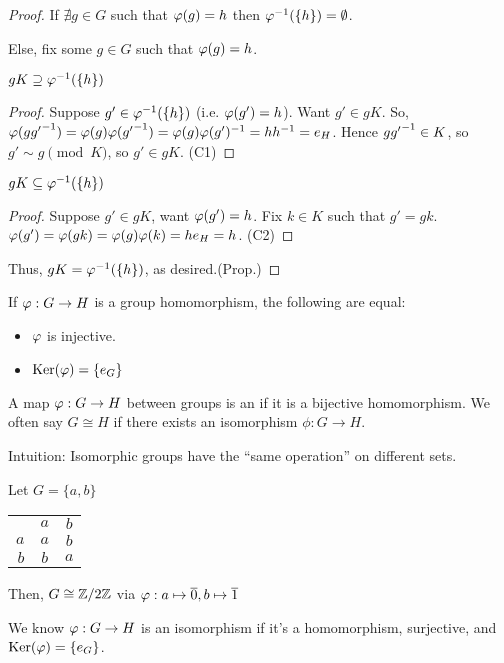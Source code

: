 \documentclass[notes.tex]{subfiles}
\begin{document}
\begin{proof}
	If $\nexists g\in G$ such that $\varphi(g) = h$ then ${\varphi}^{-1}(\{h\}) = \emptyset$.

	Else, fix some $g\in G$ such that $\varphi(g)=h$.
	\begin{claim}[1]
		$gK \supseteq {\varphi}^{-1}(\{h\})$
	\end{claim}
	\begin{proof}
		Suppose $g' \in {\varphi}^{-1}(\{h\})$ (i.e. $\varphi(g')=h$). Want $g'\in gK$.
    So, $\varphi(g {g'}^{-1}) = \varphi(g)\varphi({g'}^{-1}) = \varphi(g)\varphi(g')^{-1} = h {h}^{-1}=e_H$.
		Hence $g {g'}^{-1} \in K$, so $g'\sim g \pmod K$, so $g'\in gK$.
		\qedhere(C1)
	\end{proof}
	\begin{claim}[2]
		$gK \subseteq {\varphi}^{-1}(\{h\})$
	\end{claim}
	\begin{proof}
		Suppose $g' \in gK$, want $\varphi(g')=h$.
		Fix $k\in K$ such that $g'=gk$.
		$\varphi(g') = \varphi(gk) = \varphi(g)\varphi(k) = he_H = h$.
		\qedhere(C2)
	\end{proof}
	Thus, $gK = {\varphi}^{-1}(\{h\})$, as desired.\qedhere(Prop.)
\end{proof}

\begin{corollary}
	If $\varphi:G\to H$ is a group homomorphism, the following are equal:
	\begin{itemize}
		\item $\varphi$ is injective.
		\item $\operatorname{\mathrm{Ker}}(\varphi) = \{e_G\}$
	\end{itemize}
\end{corollary}

\begin{defn}
	A map $\varphi:G\to H$ between groups is an  if it is a bijective homomorphism.
	We often say $G\cong H$ if there exists an isomorphism $\phi:G\to H$.
\end{defn}

Intuition: Isomorphic groups have the ``same operation'' on different sets.

\begin{eg}
	Let $G = \{a, b\}$
	\begin{tabular}{r|cc}
		& $a$ & $b$\\\cline{2-3}
		$a$ & $a$ & $b$\\
		$b$ & $b$ & $a$
	\end{tabular}
	Then, $G\cong \mathbb{Z}/2\mathbb{Z}$ via $\varphi : a\mapsto \overline{0}, b\mapsto\overline{1}$
\end{eg}

We know $\varphi:G\to H$ is an isomorphism if it's a homomorphism, surjective, and $\operatorname{\mathrm{Ker}}(\varphi) = \{e_G\}$.
\end{document}

